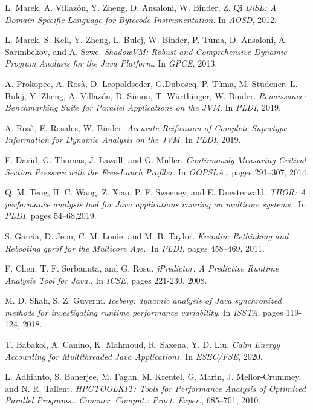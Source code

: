 \documentclass[]{usiinfthesis}
\begin{document}
\begin{thebibliography}{9}
L. Marek, A. Villaz\'{o}n, Y. Zheng, D. Ansaloni, W. Binder, Z. Qi
\textit{DiSL: A Domain-Specific Language for Bytecode Instrumentation}. 
In \textit{AOSD}, 2012.

L. Marek, S. Kell, Y. Zheng, L. Bulej, W. Binder, P. T\r{u}ma, D. Ansaloni, A. Sarimbekov, and A. Sewe.
\textit{ShadowVM: Robust and Comprehensive Dynamic Program Analysis for the Java Platform}. 
In \textit{GPCE}, 2013.

A. Prokopec, A. Rosà, D. Leopoldseder, G.Duboscq, P. T\r{u}ma, M. Studener, L. Bulej, Y. Zheng, A. Villaz\'{o}n, D. Simon, T. Würthinger, W. Binder.
\textit{Renaissance: Benchmarking Suite for Parallel Applications on the JVM}. 
In \textit{PLDI}, 2019.

A. Rosà, E. Rosales, W. Binder.
\textit{Accurate Reification of Complete Supertype Information for Dynamic Analysis on the JVM}. 
In \textit{PLDI}, 2019.

F. David, G. Thomas, J. Lawall, and G. Muller.
\textit{Continuously Measuring Critical Section Pressure with the Free-Lunch Profiler}. 
In \textit{OOPSLA,}, pages
291–307, 2014.

Q. M. Teng, H. C. Wang, Z. Xiao, P. F. Sweeney, and E. Duesterwald.
\textit{THOR: A performance analysis tool for Java applications running on multicore systems.}. 
In \textit{PLDI}, pages 54–68,2019.

S. Garcia, D. Jeon, C. M. Louie, and M. B. Taylor.
\textit{Kremlin: Rethinking and Rebooting gprof for the Multicore Age.}. 
In \textit{PLDI}, pages 458–469, 2011.

F. Chen, T. F. Serbanuta, and G. Rosu.
\textit{jPredictor: A Predictive Runtime
Analysis Tool for Java.}. 
In \textit{ICSE}, pages 221-230, 2008.

M. D. Shah, S. Z. Guyerm.
\textit{Iceberg: dynamic analysis of Java synchronized methods for investigating runtime performance variability}. 
In \textit{ISSTA}, pages 119-124, 2018.

T. Babakol, A. Canino, K. Mahmoud, R. Saxena, Y. D. Liu.
\textit{Calm Energy Accounting for Multithreaded Java Applications}. 
In \textit{ESEC/FSE}, 2020.

L. Adhianto, S. Banerjee, M. Fagan, M. Krentel, G. Marin, J. Mellor-Crummey, and N. R. Tallent.
\textit{HPCTOOLKIT: Tools for Performance Analysis of Optimized Parallel Programs.}. 
\textit{Concurr. Comput.: Pract. Exper.}, 685–701, 2010.


\end{thebibliography}
\end{document}
